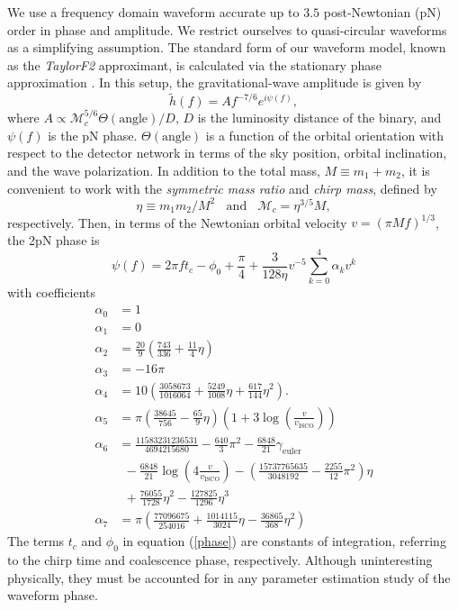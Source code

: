 \documentclass{emulateapj}
\begin{document}
We use a frequency domain waveform accurate up to $3.5$
post-Newtonian (pN) order in phase and amplitude.  We restrict ourselves to
quasi-circular waveforms as a simplifying assumption.  The standard
form of our waveform model, known as the \textit{TaylorF2}
approximant, is calculated via the stationary phase approximation \citep{BuonannoWaveform}.
  In this setup, the gravitational-wave
amplitude is given by
\begin{equation}
\tilde{h}(f) = A f^{-7/6}e^{i \psi(f)},
\label{amplitude}
\end{equation}
where $A \propto \mathcal{M}_c^{5/6}\Theta(\text{angle})/D$, $D$ is
the luminosity distance of the binary, and $\psi(f)$ is the pN phase.
$\Theta(\text{angle})$ is a function of the orbital orientation with
respect to the detector network in terms of the sky position, orbital
inclination, and the wave polarization.  In addition to the total
mass, $M\equiv m_1+m_2$, it is convenient to work with the
\textit{symmetric mass ratio} and \textit{chirp mass}, defined by
\begin{equation}
  \eta\equiv m_1m_2/M^2~~~~\text{and}~~~~\mathcal{M}_c = \eta^{3/5}M,
\end{equation}
respectively.  Then, in terms of the Newtonian orbital velocity
$v=(\pi M f)^{1/3}$, the 2pN phase is
\begin{equation}
\psi(f) = 2 \pi f t_c - \phi_0 + \frac{\pi}{4} + \frac{3}{128 \eta}v^{-5}\sum^{4}_{k=0}\alpha_{k}v^k
\label{phase}
\end{equation}
with coefficients
\begin{align}
\alpha_0 &= 1\\
\alpha_1 &= 0 \nonumber\\
\alpha_2 &= \frac{20}{9}\left(\frac{743}{336}+\frac{11}{4}\eta\right)\nonumber\\
\alpha_3 &= -16\pi \nonumber\\
\alpha_4 &= 10\left(\frac{3058673}{1016064}+\frac{5249}{1008}\eta+\frac{617}{144}\eta^2  \right) . \nonumber\\
\alpha_5 &= \pi\left(\frac{38645}{756}-\frac{65}{9}\eta\right)\left(1+3\log\left(\frac{v}{v_{\text{ISCO}}}\right)\right)\nonumber\\
\alpha_6 &= \frac{11583231236531}{4694215680} - \frac{640}{3}\pi^2 - \frac{6848}{21}\gamma_{\text{euler}} \nonumber\\
         &~~- \frac{6848}{21} \log\left(4 \frac{v}{v_{\text{ISCO}}}\right) -\left(\frac{15737765635}{3048192}-\frac{2255}{12}\pi^2\right)\eta\nonumber\\
           &~~+ \frac{76055}{1728}\eta^2 - \frac{127825}{1296}\eta^3\nonumber\\
\alpha_7 &= \pi\left(\frac{77096675}{254016}+\frac{1014115}{3024}\eta - \frac{36865}{368}\eta^2\right)\nonumber
\end{align}
The terms $t_c$ and $\phi_0$ in equation (\ref{phase}) are constants
of integration, referring to the chirp time and coalescence phase,
respectively.  Although uninteresting physically, they must be
accounted for in any parameter estimation study of the waveform phase.
\end{document}
